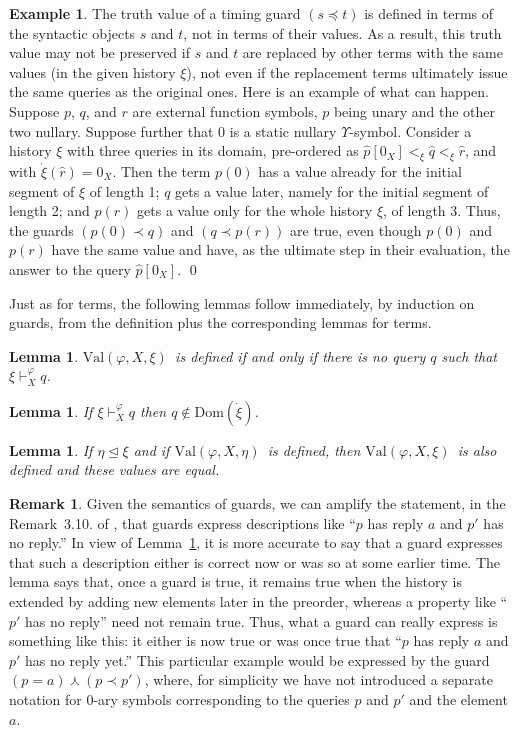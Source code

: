 \documentclass{LMCS}
\newtheorem{la}[thm]{Lemma}
\theoremstyle{definition}
\newtheorem{ex}[thm]{Example}
\newtheorem{rmk}[thm]{Remark}
\newcommand{\U}{\Upsilon}
\newcommand{\ans}{\dot}
\newcommand{\dom}[1]{\ensuremath{{\text{Dom}}(#1)}}
\newcommand{\initeq}{\unlhd}
\newcommand{\kand}{\curlywedge}
\newcommand{\val}[3]{\ensuremath{\text{Val}(#1,#2,#3)}}
\renewcommand{\phi}{\varphi}
\begin{document}
\begin{ex}
The truth value of a timing guard $(s\preceq t)$ is defined in terms of
the syntactic objects $s$ and $t$, not in terms of their values.  As a
result, this truth value may not be preserved if $s$ and $t$ are replaced
by other terms with the same values (in the given history $\xi$), not even
if the replacement terms ultimately issue the same queries as the original
ones.  Here is an example of what can happen.  Suppose $p$, $q$, and $r$
are external function symbols, $p$ being unary and the other two nullary.
Suppose further that 0 is a static nullary $\U$-symbol.  Consider a history
$\xi$ with three queries in its domain, pre-ordered as $\hat
p[0_X]<_\xi\hat q<_\xi\hat r$, and with $\ans\xi(\hat r)=0_X$.  Then the
term $p(0)$ has a value already for the initial segment of $\xi$ of length
1; $q$ gets a value later, namely for the initial segment of length 2; and
$p(r)$ gets a value only for the whole history $\xi$, of length 3.  Thus,
the guards $(p(0)\prec q)$ and $(q\prec p(r))$ are true, even though
$p(0)$ and $p(r)$ have the same value and have, as the ultimate step in
their evaluation, the answer to the query $\hat p[0_X]$.  \qed\end{ex}

Just as for terms, the following lemmas follow immediately, by
induction on guards, from the definition plus the corresponding lemmas
for terms.

\begin{la}   \label{df-noq-g}
  \val\phi X\xi\ is defined if and only if there is no query
$q$ such that $\xi\vdash^\phi_Xq$.
\end{la}

\begin{la}   \label{no-rep-g}
If $\xi\vdash^\phi_Xq$ then $q\notin\dom{\ans\xi}$.
\end{la}

\begin{la}   \label{mon-g}
If $\eta\initeq\xi$ and if \val\phi X\eta\ is defined, then \val\phi
  X\xi\ is also defined and these values are equal.
\end{la}

\begin{rmk}
  Given the semantics of guards, we can amplify the statement, in the
  Remark~3.10. of \cite{ga1}, that guards express descriptions like
  ``$p$ has reply $a$ and $p'$ has no reply.''  In view of
  Lemma~\ref{mon-g}, it is more accurate to say that a guard expresses
  that such a description either is correct now or was so at some
  earlier time.  The lemma says that, once a guard is true, it remains
  true when the history is extended by adding new elements later in
  the preorder, whereas a property like ``$p'$ has no reply'' need not
  remain true.  Thus, what a guard can really express is something
  like this: it either is now true or was once true that ``$p$ has
  reply $a$ and $p'$ has no reply yet.''  This particular example
  would be expressed by the guard $(p=a)\kand(p\prec p')$, where, for
  simplicity we have not introduced a separate notation for 0-ary
  symbols corresponding to the queries $p$ and $p'$ and the element
  $a$.
\end{rmk}
\end{document}
